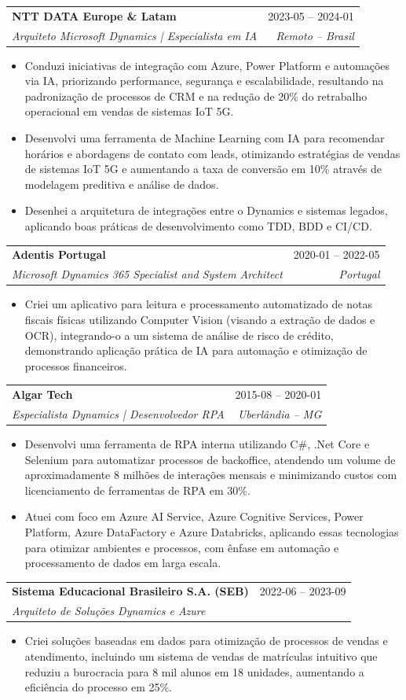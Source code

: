 \documentclass[a4paper,11pt]{article}
\makeatletter
\newcommand{\resumeItem}[1]{
  \item\small{
    {#1 \vspace{-2pt}}
  }
}
\newcommand{\resumeSubheading}[4]{
  \vspace{-1pt}\item
  \begin{tabular*}{0.97\textwidth}{l@{\extracolsep{\fill}}r}
    \textbf{#1} & #2 \\
    \textit{\small#3} & \textit{\small #4} \\
  \end{tabular*}\vspace{-5pt}
}
\newcommand{\resumeItemListStart}{\begin{itemize}}
\newcommand{\resumeItemListEnd}{\end{itemize}\vspace{-5pt}}
\makeatother
\begin{document}
\resumeSubheading
{NTT DATA Europe \& Latam}{2023-05 – 2024-01}
{Arquiteto Microsoft Dynamics | Especialista em IA}{Remoto – Brasil}
\resumeItemListStart
\resumeItem{Conduzi iniciativas de integração com Azure, Power Platform e automações via IA, priorizando performance, segurança e escalabilidade, resultando na padronização de processos de CRM e na redução de 20\% do retrabalho operacional em vendas de sistemas IoT 5G.}
\resumeItem{Desenvolvi uma ferramenta de Machine Learning com IA para recomendar horários e abordagens de contato com leads, otimizando estratégias de vendas de sistemas IoT 5G e aumentando a taxa de conversão em 10\% através de modelagem preditiva e análise de dados.}
\resumeItem{Desenhei a arquitetura de integrações entre o Dynamics e sistemas legados, aplicando boas práticas de desenvolvimento como TDD, BDD e CI/CD.}
\resumeItemListEnd

\resumeSubheading
{Adentis Portugal}{2020-01 – 2022-05}
{Microsoft Dynamics 365 Specialist and System Architect}{Portugal}
\resumeItemListStart
\resumeItem{Criei um aplicativo para leitura e processamento automatizado de notas fiscais físicas utilizando Computer Vision (visando a extração de dados e OCR), integrando-o a um sistema de análise de risco de crédito, demonstrando aplicação prática de IA para automação e otimização de processos financeiros.}
\resumeItemListEnd

\resumeSubheading
{Algar Tech}{2015-08 – 2020-01}
{Especialista Dynamics | Desenvolvedor RPA}{Uberlândia – MG}
\resumeItemListStart
\resumeItem{Desenvolvi uma ferramenta de RPA interna utilizando C\#, .Net Core e Selenium para automatizar processos de backoffice, atendendo um volume de aproximadamente 8 milhões de interações mensais e minimizando custos com licenciamento de ferramentas de RPA em 30\%.}
\resumeItem{Atuei com foco em Azure AI Service, Azure Cognitive Services, Power Platform, Azure DataFactory e Azure Databricks, aplicando essas tecnologias para otimizar ambientes e processos, com ênfase em automação e processamento de dados em larga escala.}
\resumeItemListEnd

\resumeSubheading
{Sistema Educacional Brasileiro S.A. (SEB)}{2022-06 – 2023-09}
{Arquiteto de Soluções Dynamics e Azure}{}
\resumeItemListStart
\resumeItem{Criei soluções baseadas em dados para otimização de processos de vendas e atendimento, incluindo um sistema de vendas de matrículas intuitivo que reduziu a burocracia para 8 mil alunos em 18 unidades, aumentando a eficiência do processo em 25\%.}
\resumeItemListEnd
\end{document}

